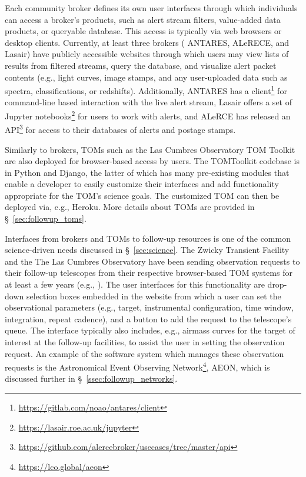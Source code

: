 Each community broker defines its own user interfaces through which individuals can access a broker's products, such as alert stream filters, value-added data products, or queryable database.
This access is typically via web browsers or desktop clients.
Currently, at least three brokers ( {ANTARES}, ALeRECE, and Lasair) have publicly accessible websites through which users may view lists of results from filtered streams, query the database, and visualize alert packet contents (e.g., light curves, image stamps, and any user-uploaded data such as spectra, classifications, or redshifts).
Additionally,  {ANTARES} has a client\footnote{\url{https://gitlab.com/noao/antares/client}} for command-line based interaction with the live alert stream, Lasair offers a set of {\sc Jupyter} notebooks\footnote{\url{https://lasair.roe.ac.uk/jupyter}} for users to work with alerts, and ALeRCE has released an  {API}\footnote{\url{https://github.com/alercebroker/usecases/tree/master/api}} for access to their databases of alerts and postage stamps.

Similarly to brokers, TOMs such as the Las Cumbres Observatory  {TOM} Toolkit \citep{2018SPIE10707E..11S} are also deployed for browser-based access by users.
The TOMToolkit codebase is in {\sc Python} and {\sc Django}, the latter of which has many pre-existing modules that enable a developer to easily customize their interfaces and add functionality appropriate for the  {TOM}'s science goals.
The customized  {TOM} can then be deployed via, e.g., {\sc Heroku}. More details about TOMs are provided in \S~\ref{sec:followup_toms}.

Interfaces from brokers and TOMs to follow-up resources is one of the common science-driven needs discussed in \S~\ref{sec:science}.
The Zwicky Transient Facility and the The Las Cumbres Observatory have been sending observation requests to their follow-up telescopes from their respective browser-based  {TOM} systems for at least a few years (e.g., \citealt{2018SPIE10707E..11S}).
The user interfaces for this functionality are drop-down selection boxes embedded in the website from which a user can set the observational parameters (e.g., target, instrumental  {configuration}, time window, integration, repeat cadence), and a button to add the request to the telescope's queue.
The interface typically also includes, e.g.,  {airmass} curves for the target of interest at the follow-up facilities, to assist the user in setting the observation request.
An example of the software system which manages these observation requests is the Astronomical Event Observing Network\footnote{\url{https://lco.global/aeon}},  {AEON}, which is discussed further in \S~\ref{ssec:followup_networks}.

